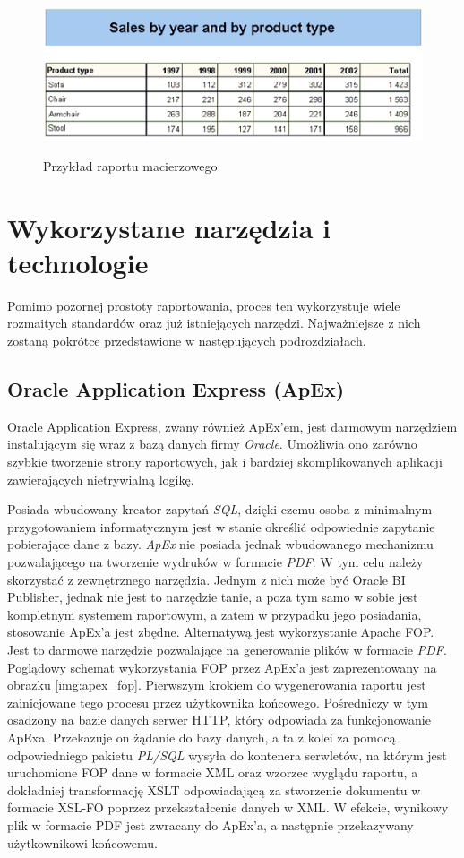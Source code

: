\documentclass[11pt,a4paper]{article}
\begin{document}
\begin{figure}[h]
\centering
\caption{Przykład raportu macierzowego}
\includegraphics[scale=1]{crosstab_report}
\label{img:ct}
\end{figure}

\newpage

\section{Wykorzystane narzędzia i technologie} \label{sec:tools}
Pomimo pozornej prostoty raportowania, proces ten wykorzystuje wiele rozmaitych standardów oraz już istniejących narzędzi. Najważniejsze z nich zostaną pokrótce przedstawione w następujących podrozdziałach.

\subsection{Oracle Application Express (ApEx)} \label{tools:apex}
Oracle Application Express, zwany również ApEx'em, jest darmowym narzędziem instalującym się wraz z bazą danych firmy \emph{Oracle}. Umożliwia ono zarówno szybkie tworzenie strony raportowych, jak i bardziej skomplikowanych aplikacji zawierających nietrywialną logikę.

 Posiada wbudowany kreator zapytań \emph{SQL}, dzięki czemu osoba z minimalnym przygotowaniem informatycznym jest w stanie określić odpowiednie zapytanie pobierające dane z bazy. \emph{ApEx} nie posiada jednak wbudowanego mechanizmu pozwalającego na tworzenie wydruków w formacie \emph{PDF}. W tym celu należy skorzystać z zewnętrznego narzędzia. Jednym z nich może być Oracle BI Publisher, jednak nie jest to narzędzie tanie, a poza tym samo w sobie jest kompletnym systemem raportowym, a zatem w przypadku jego posiadania, stosowanie ApEx'a jest zbędne. Alternatywą jest wykorzystanie Apache FOP. Jest to darmowe narzędzie pozwalające na generowanie plików w formacie \emph{PDF}. Poglądowy schemat wykorzystania FOP przez ApEx'a jest zaprezentowany na obrazku 
\ref{img:apex_fop}. Pierwszym krokiem do wygenerowania raportu jest zainicjowane tego procesu przez użytkownika końcowego. Pośredniczy w tym osadzony na bazie danych serwer HTTP, który odpowiada za funkcjonowanie ApExa. Przekazuje on żądanie do bazy danych, a ta z kolei za pomocą odpowiedniego pakietu \emph{PL/SQL} wysyła do kontenera serwletów, na którym jest uruchomione FOP dane w formacie XML oraz wzorzec wyglądu raportu, a dokładniej transformację XSLT odpowiadającą za stworzenie dokumentu w formacie XSL-FO poprzez przekształcenie danych w XML. W efekcie, wynikowy plik w formacie PDF jest zwracany do ApEx'a, a następnie przekazywany użytkownikowi końcowemu. 
\end{document}
